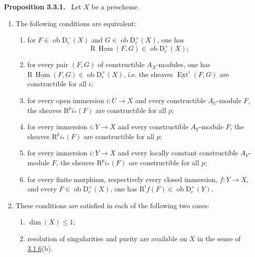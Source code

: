 \documentclass[11pt]{article}
\providecommand{\uExt}{\underline{\Ext}}
\newenvironment{statement}[1]{\par\medskip\noindent\textbf{#1.}\ }{\par\medskip}
\DeclareMathOperator{\Hom}{Hom}
\DeclareMathOperator{\Ext}{Ext}
\newcommand{\R}{\mathrm{R}}
\newcommand{\D}{\mathrm{D}}
\newcommand{\ob}{\operatorname{ob}}
\providecommand{\Hom}{\operatorname{Hom}}
\providecommand{\ob}{\operatorname{ob}}
\providecommand{\R}{\mathrm R}
\providecommand{\Hom}{\operatorname{Hom}}
\begin{document}
\label{sga5:I:proposition:3.3.1}\begin{statement}{Proposition 3.3.1}
Let $X$ be a prescheme.
\begin{enumerate}[label=\alph*)]
\item The following conditions are equivalent:
\begin{enumerate}[label=(\roman*)]
\item for $F\in\ob\D_c^-(X)$ and $G\in\ob\D_c^+(X)$, one has
\[
   \R\,\underline{\Hom}(F,G)\in\ob\D_c^+(X);
\]
\item[(i bis)] for every pair $(F,G)$ of constructible $A_X$-modules, one has $\R\,\underline{\Hom}(F,G)\in\ob\D_c^+(X)$, i.e. the sheaves $\uExt^i(F,G)$ are constructible for all $i$;
\item for every open immersion $i:U\to X$ and every constructible $A_U$-module $F$, the sheaves $\R^pi_*(F)$ are constructible for all $p$;
\item[(ii bis)] for every immersion $i:Y\to X$ and every constructible $A_Y$-module $F$, the sheaves $\R^pi_*(F)$ are constructible for all $p$;
\item[(ii ter)] for every immersion $i:Y\to X$ and every locally constant constructible $A_Y$-module $F$, the sheaves $\R^pi_*(F)$ are constructible for all $p$;
\item for every finite morphism, respectively every closed immersion, $f:Y\to X$, and every $F\in\ob\D_c^+(X)$, one has $\R^!f(F)\in\ob\D_c^+(Y)$.
\end{enumerate}
\item These conditions are satisfied in each of the following two cases:
\begin{enumerate}[label=(\roman*)]
\item $\dim(X)\le1$;
\item resolution of singularities and purity are available on $X$ in the sense of \hyperref[sga5:I:statement:3.1.6]{3.1.6}(b).
\end{enumerate}
\end{enumerate}
\end{statement}
\end{document}
